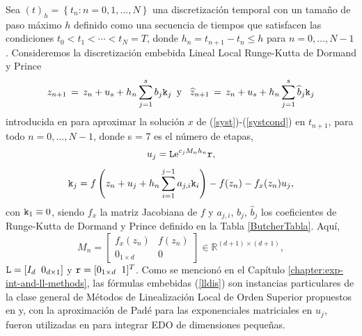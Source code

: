 Sea $\left( t\right) _{h}=\left\{ t_{n}:n=0,1,\ldots ,N\right\}$ una discretización temporal con un tamaño de paso máximo $h$ definido como una secuencia de tiempos que satisfacen las condiciones $t_{0}<t_{1}<\cdots <t_{N}=T$, donde $h_{n}=t_{n+1}-t_{n}\leq h$ para $n=0,\ldots,N-1$.
Consideremos la discretización embebida Lineal Local Runge-Kutta de Dormand y Prince
\begin{equation} \label{lldis}
    z_{n+1}\,=\,z_n+u_s+h_n \sum_{j=1}^{s}b_j \mathtt{k}_j \,\,\, \text{y} \,\,\, \
    \widehat{z}_{n+1}\,=\, z_n+u_s+h_n \sum_{j=1}^{s}\widehat{b}_j \mathtt{k}_j
\end{equation}
introducida en \cite{Jimenez14AMC} para aproximar la solución $x$ de (\ref{syst})-(\ref{systcond}) en $t_{n+1}$, para todo $n=0,\ldots,N -1$, donde s = 7 es el número de etapas,
\begin{equation*}
u_j=\mathtt{L}\mathrm{e}^{c_j M_n h_n}\mathtt{r},
\end{equation*}
\begin{equation*}
\mathtt{k}_j = f\left( z_n+u_j+h_n \sum_{i=1}^{j-1}a_{j,i}\mathtt{k}_i \right) - f( z_n) - f_x(z_n)u_j,
\end{equation*}
con $\mathtt{k}_1 \equiv 0$, siendo $f_x$ la matriz Jacobiana de $f$ y $a_{j,i}$, $b_j$, $\widehat{b}_j$ los coeficientes de Runge-Kutta de Dormand y Prince definido en la Tabla \ref{ButcherTabla}. Aquí,
\begin{equation*}
    M_{n}=\left[
    \begin{array}{cc}
        f_{x}(z_{n}) & f(z_{n}) \\
        0_{1\times d} & 0
    \end{array}
    \right] \in \mathbb{R}^{(d+1)\times (d+1)},
\end{equation*}
$ \mathtt{L}=[I_d \;\; 0_{d\times 1}] $ y $\mathtt{r}=[0_{1\times d}\;\; 1]^T$. Como se mencionó en el Capítulo \ref{chapter:exp-int-and-ll-methods}, las fórmulas embebidas (\ref{lldis}) son instancias particulares de la clase general de Métodos de Linealización Local de Orden Superior propuestos en \cite{Jimenez13} y, con la aproximación de Padé para las exponenciales matriciales en $u_j$, fueron utilizadas en \cite{Jimenez14AMC} para integrar EDO de dimensiones pequeñas.

